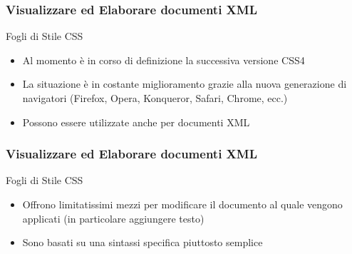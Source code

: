 \documentclass{beamer}
\begin{document}
    \begin{frame}
        \frametitle{Visualizzare ed Elaborare documenti XML}
        \addtocounter{nframe}{1}
        
        \begin{block}{Fogli di Stile CSS}
           
           \begin{itemize}
               \item Al momento è in corso di definizione la successiva versione CSS4
               \item La situazione è in costante miglioramento grazie alla nuova generazione
               di navigatori (Firefox, Opera, Konqueror, Safari, Chrome, ecc.)
               \item Possono essere utilizzate anche per documenti XML
           \end{itemize}
        \end{block}
        
    \end{frame}


    \begin{frame}
        \frametitle{Visualizzare ed Elaborare documenti XML}
        \addtocounter{nframe}{1}
        
        \begin{block}{Fogli di Stile CSS}
           
           \begin{itemize}
               \item Offrono limitatissimi mezzi per modificare il documento al quale vengono applicati (in particolare aggiungere testo)
               \item Sono basati su una sintassi specifica piuttosto semplice
           \end{itemize}
        \end{block}
        
    \end{frame}
\end{document}
